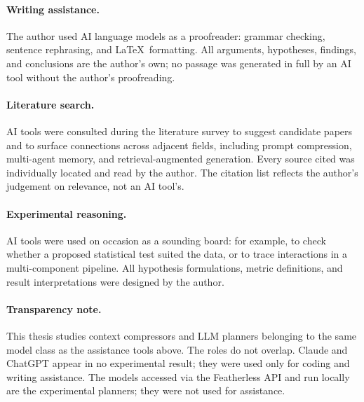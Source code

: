 \paragraph{Writing assistance.}
The author used AI language models as a proofreader: grammar checking,
sentence rephrasing, and \LaTeX\ formatting. All arguments, hypotheses,
findings, and conclusions are the author's own; no passage was generated
in full by an AI tool without the author's proofreading.

\paragraph{Literature search.}
AI tools were consulted during the literature survey to suggest candidate
papers and to surface connections across adjacent fields, including prompt
compression, multi-agent memory, and retrieval-augmented generation. Every
source cited was individually located and read by the author. The citation
list reflects the author's judgement on relevance, not an AI tool's.

\paragraph{Experimental reasoning.}
AI tools were used on occasion as a sounding board: for example, to check
whether a proposed statistical test suited the data, or to trace
interactions in a multi-component pipeline. All hypothesis formulations,
metric definitions, and result interpretations were designed by the author. 

\paragraph{Transparency note.}
This thesis studies context compressors and LLM planners belonging to the
same model class as the assistance tools above. The roles do not overlap.
Claude and ChatGPT appear in no experimental result; they were used only
for coding and writing assistance. The models accessed via the Featherless API and run locally are the experimental
planners; they were not used for assistance.
